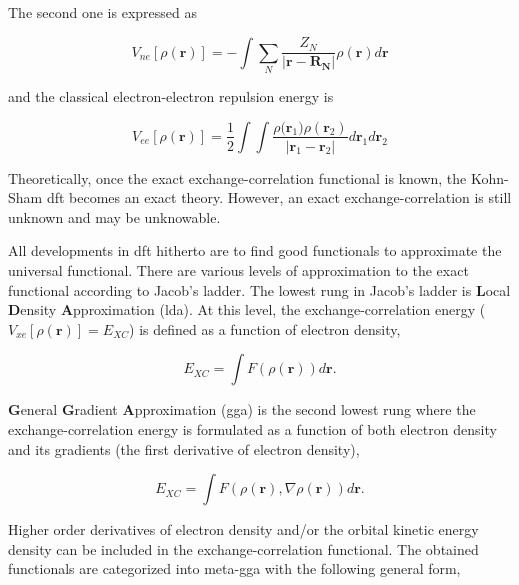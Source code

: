 \begin{refsection}
\noindent The second one is expressed as

\begin{equation}
V_{ne}[\rho(\mathbf{r})] =  -\int\sum_{N}^{}\frac{Z_N}{\left\lvert\mathbf{r}-\mathbf{R_N}\right\rvert}\rho({\mathbf{r}})d\mathbf{r}
\label{eq:Den_Vne}
\end{equation}

\noindent and the classical electron-electron repulsion energy is

\begin{equation}
V_{ee}[\rho(\mathbf{r})] =  \frac{1}{2}\int\int\frac{\rho({\mathbf{r}_1)\rho({\mathbf{r}_2})}}{\left\lvert\mathbf{r}_1-\mathbf{r}_2\right\rvert}d\mathbf{r}_1d\mathbf{r}_2
\label{eq:Den_Vee}
\end{equation}

Theoretically, once the exact exchange-correlation functional is known, the Kohn-Sham \acrshort{dft} becomes an exact theory. However, an exact exchange-correlation is still unknown and may be unknowable. \cite{c2:dft1}

All developments in \acrshort{dft} hitherto are to find good functionals to approximate the universal functional. There are various levels of approximation to the exact functional according to Jacob's ladder. \cite{c2:jacob} The lowest rung in Jacob's ladder is  \textbf{L}ocal \textbf{D}ensity \textbf{A}pproximation (\acrshort{lda}). At this level, the exchange-correlation energy ($V_{xe}[\rho(\mathbf{r})] = E_{XC}$) is defined as a function of electron density,

\begin{equation}
	E_{XC} = \int F(\rho(\mathbf{r}))d\mathbf{r}.
\end{equation}


\textbf{G}eneral \textbf{G}radient \textbf{A}pproximation (\acrshort{gga}) is the second lowest rung where the exchange-correlation energy is formulated as a function of both electron density and its gradients (the first derivative of electron density),


\begin{equation}
	E_{XC} = \int F(\rho(\mathbf{r}),\nabla\rho(\mathbf{r}))d\mathbf{r}.
\end{equation}


\noindent Higher order derivatives of electron density and/or the orbital kinetic energy density can be included in the exchange-correlation functional. The obtained functionals are categorized into meta-\acrshort{gga} with the following general form,


\end{refsection}
